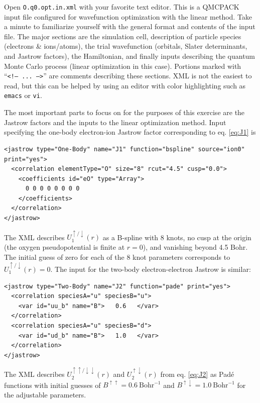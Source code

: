 Open \texttt{O.q0.opt.in.xml} with your favorite text editor.  This is a QMCPACK input file configured for wavefunction optimization with the linear method. Take a minute to familiarize yourself with the general format and contents of the input file.  The major sections are the simulation cell, description of particle species (electrons \& ions/atoms), the trial wavefunction (orbitals, Slater determinants, and Jastrow factors), the Hamiltonian, and finally inputs describing the quantum Monte Carlo process (linear optimization in this case).  Portions marked with ``\texttt{<!-- ... -->}'' are comments describing these sections.  XML is not the easiest to read, but this can be helped by using an editor with color highlighting such as \texttt{emacs} or \texttt{vi}.

The most important parts to focus on for the purposes of this exercise are the Jastrow factors and the inputs to the linear optimization method.  Input specifying the one-body electron-ion Jastrow factor corresponding to eq. \ref{eq:J1} is 
\begin{shaded}
\begin{verbatim}
<jastrow type="One-Body" name="J1" function="bspline" source="ion0" print="yes">  
  <correlation elementType="O" size="8" rcut="4.5" cusp="0.0">
    <coefficients id="eO" type="Array">                  
      0 0 0 0 0 0 0 0    
    </coefficients>
  </correlation>
</jastrow>
\end{verbatim}
\end{shaded}
\noindent
The XML describes $U_1^{\uparrow/\downarrow}(r)$ as a B-spline with 8 knots, no cusp at the origin (the oxygen pseudopotential is finite at $r=0$), and vanishing beyond 4.5 Bohr.  The initial guess of zero for each of the 8 knot parameters corresponds to $U_1^{\uparrow/\downarrow}(r)=0$.  The input for the two-body electron-electron Jastrow is similar:
\begin{shaded}
\begin{verbatim}
<jastrow type="Two-Body" name="J2" function="pade" print="yes">
  <correlation speciesA="u" speciesB="u">
    <var id="uu_b" name="B">   0.6   </var>
  </correlation>
  <correlation speciesA="u" speciesB="d">
    <var id="ud_b" name="B">   1.0   </var>  
  </correlation>
</jastrow>
\end{verbatim}
\end{shaded}
\noindent
The XML describes $U_2^{\uparrow\uparrow/\downarrow\downarrow}(r)$ and  $U_2^{\uparrow\downarrow}(r)$ from eq. \ref{eq:J2} as Pad\'{e} functions with initial guesses of $B^{\uparrow\uparrow}=0.6~\textrm{Bohr}^{-1}$ and  $B^{\uparrow\downarrow}=1.0~\textrm{Bohr}^{-1}$ for the adjustable parameters.  

